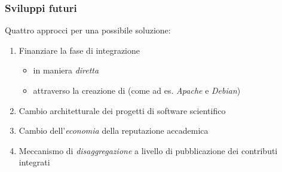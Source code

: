 \begin{frame}\frametitle{Sviluppi futuri}

\large{Quattro approcci per una possibile soluzione:}

\begin{enumerate}[<+->]
\def\labelenumi{\arabic{enumi}.}
\itemsep1pt\parskip0pt
\item
  Finanziare la fase di integrazione

  \begin{itemize}[<+->]
  \itemsep1pt\parskip0pt
  \item
    in maniera \emph{diretta}
  \item
    attraverso la creazione di  (come ad es.
    \emph{Apache} e \emph{Debian})
  \end{itemize}
\item
  Cambio architetturale dei progetti di software scientifico
\item
  Cambio dell'\emph{economia} della reputazione accademica
\item
  Meccanismo di \emph{disaggregazione} a livello di pubblicazione dei
  contributi integrati
\end{enumerate}

\end{frame}
